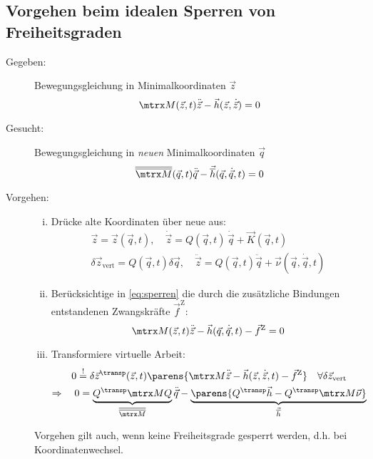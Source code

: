 	\subsection{Vorgehen beim idealen Sperren von Freiheitsgraden} %
		\begin{description}
			\item[Gegeben:] Bewegungsgleichung in Minimalkoordinaten $\vec z$
				\begin{equation}\label{eq:sperren}
					\mtrx M(\vec z, t) \ddot{\vec z} - \vec h(\vec z, \dot{\vec z}) = 0
				\end{equation}
			
			\item[Gesucht:] Bewegungsgleichung in \emph{neuen} Minimalkoordinaten $\vec q$
				\[
					\overline{\overline{\mtrx M}}(\vec q, t) \ddot{\vec q} - \vec{\overline h}(\vec q, \dot{\vec q}, t) = 0
				\]
			
			\item[Vorgehen:]
				\begin{enumerate}[(i)]
					\item Drücke alte Koordinaten über neue aus:
						\begin{gather*}
							 \vec z = \vec z(\vec q, t), \quad \dot{\vec z} = Q(\vec q, t) \, \dot{\vec q} + \vec K(\vec q, t) \\
						 \delta \vec z_\text{vert} = Q(\vec q, t) \delta \vec q, \quad \ddot{\vec z} = Q(\vec q, t) \ddot{\vec q} + \vec\nu(\vec q, \dot{\vec q}, t)
						\end{gather*}
					
					\item Berücksichtige in \eqref{eq:sperren} die durch die zusätzliche Bindungen entstandenen Zwangskräfte $\vec f^\text{Z}$:
						\[
							\mtrx M(\vec z, t) \ddot{\vec z} - \vec h(\vec q, \dot{\vec q}, t) - \vec f^\text{Z} = 0
						\]
					
					\item Transformiere virtuelle Arbeit:
						\begin{gather*}
							0 \stackrel{!}{=} \delta \vec z^\transp(\vec z, t) \parens{
								\mtrx M \ddot{\vec z} - \vec h(\vec z, \dot{\vec z}, t) - \vec f^\text{Z}
							} \quad \forall \delta \vec z_\text{vert} \\
							\Rightarrow \quad 0 = \underbrace{
								Q^\transp \mtrx M Q \vphantom{\parens{Q^\transp}}
							}_{\overline{\overline{\mtrx M}}} \ddot{\vec q}
							- \underbrace{
								\parens{
									Q^\transp \vec h - Q^\transp \mtrx M \vec\nu
								}
							}_{\vec{\overline h}}
						\end{gather*}
				\end{enumerate}
				\begin{bemerkung}
					Vorgehen gilt auch, wenn keine Freiheitsgrade gesperrt werden, d.h. bei Koordinatenwechsel.
				\end{bemerkung}
		\end{description}
